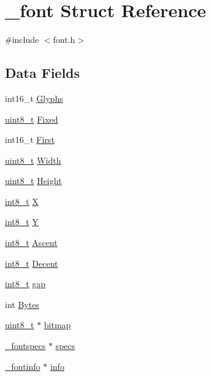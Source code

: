 \hypertarget{struct__font}{\section{\-\_\-font Struct Reference}
\label{struct__font}
}


{\ttfamily \#include $<$font.\-h$>$}

\subsection*{Data Fields}
\begin{DoxyCompactItemize}
\item 
int16\-\_\-t \hyperlink{struct__font_a1e89c06fc11a730eb602522dc8953491}{Glyphs}
\item 
\hyperlink{send_8c_aba7bc1797add20fe3efdf37ced1182c5}{uint8\-\_\-t} \hyperlink{struct__font_a76218c6b35acb78926429f247cbaa687}{Fixed}
\item 
int16\-\_\-t \hyperlink{struct__font_a73decb2a2c2880dc782cd9cda5561876}{First}
\item 
\hyperlink{send_8c_aba7bc1797add20fe3efdf37ced1182c5}{uint8\-\_\-t} \hyperlink{struct__font_ae3d3b48670f1bf4bf6dbf42794f81b31}{Width}
\item 
\hyperlink{send_8c_aba7bc1797add20fe3efdf37ced1182c5}{uint8\-\_\-t} \hyperlink{struct__font_a5888921d1a78bf917351a275e2033467}{Height}
\item 
\hyperlink{earth2wireframe_8c_aef44329758059c91c76d334e8fc09700}{int8\-\_\-t} \hyperlink{struct__font_a64a08fdbdaa19418a9b7a34a2db33150}{X}
\item 
\hyperlink{earth2wireframe_8c_aef44329758059c91c76d334e8fc09700}{int8\-\_\-t} \hyperlink{struct__font_a3c9fee9cfcc713b1aac812c14dd9a36a}{Y}
\item 
\hyperlink{earth2wireframe_8c_aef44329758059c91c76d334e8fc09700}{int8\-\_\-t} \hyperlink{struct__font_a998e54724f56879aa85c5ec169873f39}{Ascent}
\item 
\hyperlink{earth2wireframe_8c_aef44329758059c91c76d334e8fc09700}{int8\-\_\-t} \hyperlink{struct__font_a7f3567884a6aa454b7414b10dba35755}{Decent}
\item 
\hyperlink{earth2wireframe_8c_aef44329758059c91c76d334e8fc09700}{int8\-\_\-t} \hyperlink{struct__font_af4d840b8e62f6a0548cef0a5474416f4}{gap}
\item 
int \hyperlink{struct__font_a13b0b0e4e91f4d663ba4c3c11bfbda8a}{Bytes}
\item 
\hyperlink{send_8c_aba7bc1797add20fe3efdf37ced1182c5}{uint8\-\_\-t} $\ast$ \hyperlink{struct__font_a336f543c3fe3d3197c6e709fa7df0f5b}{bitmap}
\item 
\hyperlink{struct__fontspecs}{\-\_\-fontspecs} $\ast$ \hyperlink{struct__font_a76b5b07cf75a869627eca27d7a32836a}{specs}
\item 
\hyperlink{struct__fontinfo}{\-\_\-fontinfo} $\ast$ \hyperlink{struct__font_abf134e8a44e707d3b4e83ab76c952ed9}{info}
\end{DoxyCompactItemize}


